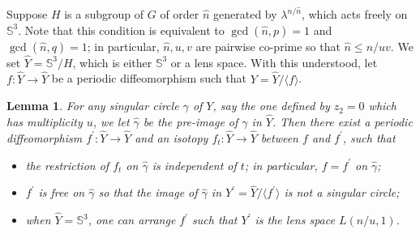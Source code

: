 \documentclass[11pt]{amsart}
\theoremstyle{plain}
\numberwithin{theorem}{section}
\newtheorem{lemma}[theorem]{Lemma}
\theoremstyle{definition}
\begin{document}
Suppose $H$ is a subgroup of $G$ of order $\hat{n}$ generated by $\lambda^{n/\hat{n}}$, which
acts freely on ${{\mathbb S}}^3$. Note that this condition is equivalent to $\gcd(\hat{n},p)=1$ and 
$\gcd(\hat{n},q)=1$; in particular, $\hat{n},u,v$ are pairwise co-prime so that $\hat{n}\leq n/uv$. 
We set $\hat{Y}={{\mathbb S}}^3/H$, which is either ${{\mathbb S}}^3$ or a lens space. With this understood, let 
$f:\hat{Y}\rightarrow \hat{Y}$ be a periodic diffeomorphism such that $Y=\hat{Y}/\langle f\rangle$.

\begin{lemma}
For any singular circle $\gamma$ of $Y$, say the one defined by $z_2=0$ which has multiplicity 
$u$, we let $\hat{\gamma}$ be the pre-image of $\gamma$ in $\hat{Y}$. Then there exist a periodic diffeomorphism $f^\prime: \hat{Y}\rightarrow \hat{Y}$ and an isotopy $f_t: \hat{Y}\rightarrow \hat{Y}$ between $f$ and $f^\prime$, such that
\begin{itemize}
\item the restriction of $f_t$ on $\hat{\gamma}$ is independent of $t$; in particular, $f=f^\prime$ on
$\hat{\gamma}$;
\item $f^\prime$ is free on $\hat{\gamma}$ so that the image of $\hat{\gamma}$ in $Y^\prime=
\hat{Y}/\langle f^\prime \rangle$ is not a singular circle;
\item when $\hat{Y}={{\mathbb S}}^3$, one can arrange $f^\prime$ such that $Y^\prime$ is the lens space 
$L(n/u,1)$. 
\end{itemize}
\end{lemma}
\end{document}
